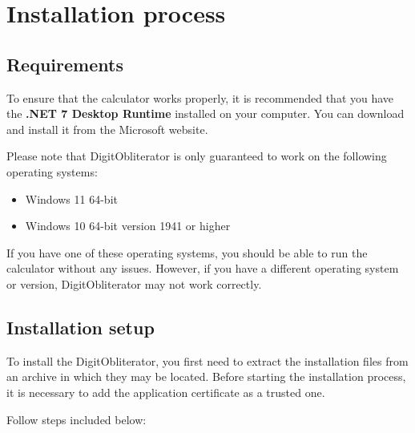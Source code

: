 \section{Installation process}
\subsection{Requirements}

To ensure that the calculator works properly, it is recommended that you have the \textbf{.NET 7 Desktop Runtime} installed on your computer. You can download and install it from the Microsoft website.

Please note that DigitObliterator is only guaranteed to work on the following operating systems:

\begin{itemize}
	\item Windows 11 64-bit
	\item Windows 10 64-bit version 1941 or higher
\end{itemize}

If you have one of these operating systems, you should be able to run the calculator without any issues. However, if you have a different operating system or version, DigitObliterator may not work correctly.
\subsection{Installation setup}
To install the DigitObliterator, you first need to extract the installation files from an archive in which they may be located. Before starting the installation process, it is necessary to add the application certificate as a trusted one.

 Follow steps included below:

